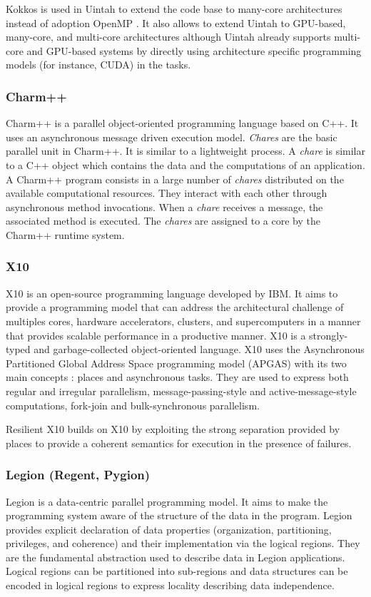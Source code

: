 Kokkos \cite{CarTS2014} is used in Uintah to extend the code base to many-core architectures instead of adoption OpenMP \cite{HPHSD2019}.
It also allows to extend Uintah to  GPU-based, many-core, and multi-core architectures although Uintah already supports  multi-core and GPU-based systems by directly using architecture specific programming models (for instance, CUDA) in the tasks.

\subsubsection{Charm++}
Charm++ \cite{KaleK1993} \cite{RobBK2016} is a parallel object-oriented programming language based on C++.
It uses an asynchronous message driven execution model.
\textit{Chares} are the basic parallel unit in Charm++.
It is similar to a lightweight process.
A \textit{chare} is similar to a C++ object which contains the data and the computations of an application.
A Charm++ program consists in a large number of \textit{chares} distributed on the available computational resources.
They interact with each other through asynchronous method invocations.
When a \textit{chare} receives a message, the associated method is executed.
The \textit{chares} are assigned to a core by the Charm++ runtime system.

\subsubsection{X10}
X10 \cite{CGSDK2005} is an open-source programming language developed by IBM.
It aims to provide a programming model that can address the architectural challenge of multiples cores, hardware accelerators, clusters, and supercomputers in a manner that provides scalable performance in a productive manner.
X10 is a strongly-typed and garbage-collected object-oriented language.
X10 uses the Asynchronous Partitioned Global Address Space programming model (APGAS) with its two main concepts :  places and asynchronous tasks.
They are used to express both regular and irregular parallelism, message-passing-style and active-message-style computations, fork-join and bulk-synchronous parallelism.

Resilient X10 \cite{HHMGT2016}  \cite{GHHIK2019} builds on X10 by exploiting the strong separation provided by places to provide a coherent semantics for execution in the presence of failures.

\subsubsection{Legion (Regent, Pygion)}
Legion \cite{BaTSA2012} is a data-centric parallel programming model.
It aims to make the programming system aware of the structure of the data in the program.
Legion provides explicit declaration of data properties (organization, partitioning, privileges, and coherence) and their implementation via the logical regions.
They are the fundamental abstraction used to describe data in Legion applications.
Logical regions can be partitioned into sub-regions and data structures can be encoded in logical regions to express locality describing data independence.

